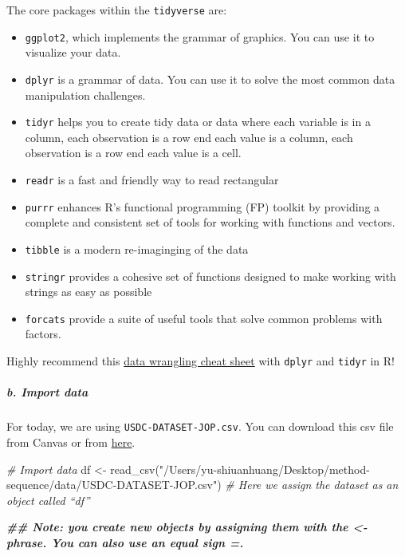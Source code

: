 \documentclass[
]{article}
\newenvironment{Shaded}{\begin{snugshade}}{\end{snugshade}}
\newcommand{\CommentTok}[1]{\textcolor[rgb]{0.56,0.35,0.01}{\textit{#1}}}
\newcommand{\DocumentationTok}[1]{\textcolor[rgb]{0.56,0.35,0.01}{\textbf{\textit{#1}}}}
\newcommand{\FunctionTok}[1]{\textcolor[rgb]{0.00,0.00,0.00}{#1}}
\newcommand{\NormalTok}[1]{#1}
\newcommand{\OtherTok}[1]{\textcolor[rgb]{0.56,0.35,0.01}{#1}}
\newcommand{\StringTok}[1]{\textcolor[rgb]{0.31,0.60,0.02}{#1}}
\providecommand{\tightlist}{%
  \setlength{\itemsep}{0pt}\setlength{\parskip}{0pt}}
\begin{document}
The core packages within the \texttt{tidyverse} are:

\begin{itemize}
\tightlist
\item
  \texttt{ggplot2}, which implements the grammar of graphics. You can
  use it to visualize your data.
\item
  \texttt{dplyr} is a grammar of data. You can use it to solve the most
  common data manipulation challenges.
\item
  \texttt{tidyr} helps you to create tidy data or data where each
  variable is in a column, each observation is a row end each value is a
  column, each observation is a row end each value is a cell.
\item
  \texttt{readr} is a fast and friendly way to read rectangular
\item
  \texttt{purrr} enhances R's functional programming (FP) toolkit by
  providing a complete and consistent set of tools for working with
  functions and vectors.
\item
  \texttt{tibble} is a modern re-imaginging of the data
\item
  \texttt{stringr} provides a cohesive set of functions designed to make
  working with strings as easy as possible
\item
  \texttt{forcats} provide a suite of useful tools that solve common
  problems with factors.
\end{itemize}

Highly recommend this
\href{https://www.rstudio.com/wp-content/uploads/2015/02/data-wrangling-cheatsheet.pdf}{data
wrangling cheat sheet} with \texttt{dplyr} and \texttt{tidyr} in R!

\hypertarget{b.-import-data}{%
\subparagraph{b. Import data}\label{b.-import-data}}

For today, we are using \texttt{USDC-DATASET-JOP.csv}. You can download
this csv file from Canvas or from
\href{https://dataverse.harvard.edu/file.xhtml?fileId=4306747\&version=1.0.}{here}.

\begin{Shaded}
\begin{Highlighting}[]
\CommentTok{\# Import data}
\NormalTok{df }\OtherTok{\textless{}{-}} \FunctionTok{read\_csv}\NormalTok{(}\StringTok{"/Users/yu{-}shiuanhuang/Desktop/method{-}sequence/data/USDC{-}DATASET{-}JOP.csv"}\NormalTok{) }\CommentTok{\# Here we assign the dataset as an object called “df”}

\DocumentationTok{\#\# Note: you create new objects by assigning them with the \textasciigrave{}\textless{}{-}\textasciigrave{} phrase. You can also use an equal sign \textasciigrave{}=\textasciigrave{}.}
\end{Highlighting}
\end{Shaded}
\end{document}
